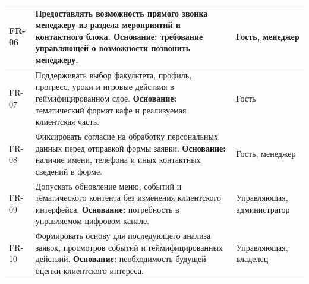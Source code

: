 \begin{table}[H]
\begin{tabularx}{\textwidth}{|>{\raggedright\arraybackslash}p{}|>{\raggedright\arraybackslash}p{}|>{\raggedright\arraybackslash}X|}
FR-06 & Предоставлять возможность прямого звонка менеджеру из раздела мероприятий и контактного блока. \newline \textbf{Основание:} требование управляющей о возможности позвонить менеджеру. & Гость, менеджер \\ \hline
FR-07 & Поддерживать выбор факультета, профиль, прогресс, уроки и игровые действия в геймифицированном слое. \newline \textbf{Основание:} тематический формат кафе и реализуемая клиентская часть. & Гость \\ \hline
FR-08 & Фиксировать согласие на обработку персональных данных перед отправкой формы заявки. \newline \textbf{Основание:} наличие имени, телефона и иных контактных сведений в форме. & Гость, менеджер \\ \hline
FR-09 & Допускать обновление меню, событий и тематического контента без изменения клиентского интерфейса. \newline \textbf{Основание:} потребность в управляемом цифровом канале. & Управляющая, администратор \\ \hline
FR-10 & Формировать основу для последующего анализа заявок, просмотров событий и геймифицированных действий. \newline \textbf{Основание:} необходимость будущей оценки клиентского интереса. & Управляющая, владелец \\ \hline
\end{tabularx}
\normalsize
\end{table}

